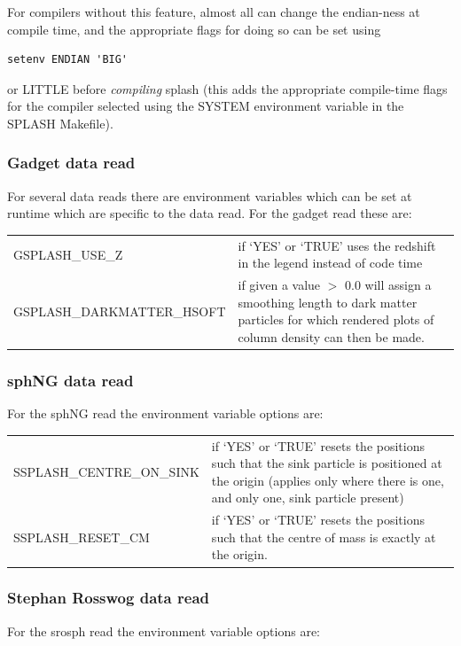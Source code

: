 \documentclass[a4paper,11pt]{article}
\begin{document}
 For compilers without this feature, almost all can change the endian-ness at compile time, and the appropriate flags for doing so can be set using
\begin{verbatim}
setenv ENDIAN 'BIG'
\end{verbatim}
or LITTLE before \emph{compiling} splash (this adds the appropriate compile-time flags for the compiler selected using the SYSTEM environment variable in the SPLASH Makefile). 

\subsubsection{ Gadget data read}
\label{sec:gsplash}
 For several data reads there are environment variables which can be set at runtime which are specific to the data read. For the gadget read these are:\newline

\begin{tabular}{p{}p{}}
GSPLASH\_USE\_Z & if `YES' or `TRUE' uses the redshift in the legend instead of code time \\
GSPLASH\_DARKMATTER\_HSOFT & if given a value $>$ 0.0 will assign a smoothing length to dark matter particles for which rendered plots of column density can then be made.
\end{tabular}

\subsubsection{ sphNG data read}
 For the sphNG read the environment variable options are:\newline

\begin{tabular}{p{}p{}}
SSPLASH\_CENTRE\_ON\_SINK & if `YES' or `TRUE' resets the positions such that the sink particle is positioned at the origin (applies only where there is one, and only one, sink particle present)\\
SSPLASH\_RESET\_CM & if `YES' or `TRUE' resets the positions such that the centre of mass is exactly at the origin.
\end{tabular}

\subsubsection{ Stephan Rosswog data read}
 For the srosph read the environment variable options are:\newline
\end{document}
